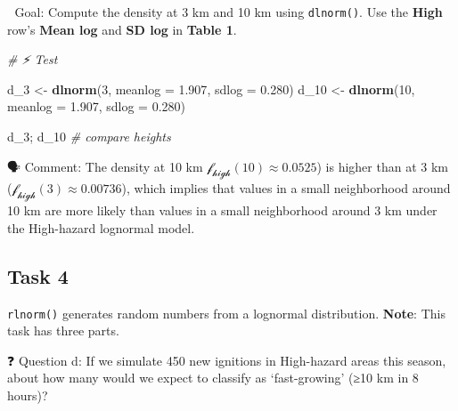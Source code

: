 \documentclass[
  12pt,
]{scrreprt}
\newenvironment{Shaded}{\begin{snugshade}}{\end{snugshade}}
\newcommand{\AttributeTok}[1]{\textcolor[rgb]{0.13,0.29,0.53}{#1}}
\newcommand{\CommentTok}[1]{\textcolor[rgb]{0.56,0.35,0.01}{\textit{#1}}}
\newcommand{\DecValTok}[1]{\textcolor[rgb]{0.00,0.00,0.81}{#1}}
\newcommand{\FloatTok}[1]{\textcolor[rgb]{0.00,0.00,0.81}{#1}}
\newcommand{\FunctionTok}[1]{\textcolor[rgb]{0.13,0.29,0.53}{\textbf{#1}}}
\newcommand{\NormalTok}[1]{#1}
\newcommand{\OtherTok}[1]{\textcolor[rgb]{0.56,0.35,0.01}{#1}}
\begin{document}
🎯 Goal: Compute the density at 3 km and 10 km using \texttt{dlnorm()}. Use the \textbf{High} row's \textbf{Mean log} and \textbf{SD log} in \textbf{Table 1}.

\begin{Shaded}
\begin{Highlighting}[]
\CommentTok{\# ⚡ Test}

\NormalTok{d\_3  }\OtherTok{\textless{}{-}} \FunctionTok{dlnorm}\NormalTok{(}\DecValTok{3}\NormalTok{,  }\AttributeTok{meanlog =} \FloatTok{1.907}\NormalTok{, }\AttributeTok{sdlog =} \FloatTok{0.280}\NormalTok{)}
\NormalTok{d\_10 }\OtherTok{\textless{}{-}} \FunctionTok{dlnorm}\NormalTok{(}\DecValTok{10}\NormalTok{, }\AttributeTok{meanlog =} \FloatTok{1.907}\NormalTok{, }\AttributeTok{sdlog =} \FloatTok{0.280}\NormalTok{)}
\end{Highlighting}
\end{Shaded}

\begin{Shaded}
\begin{Highlighting}[]
\NormalTok{d\_3; d\_10  }\CommentTok{\# compare heights}
\end{Highlighting}
\end{Shaded}

🗣 Comment: The density at 10 km \(\mathcal{f_{high}}(10) \approx 0.0525\)) is higher than at 3 km (\(\mathcal{f_{high}}(3) \approx 0.00736\)), which implies that values in a small neighborhood around 10 km are more likely than values in a small neighborhood around 3 km under the High-hazard lognormal model.

\subsection{Task 4}\label{task-4-1}

\texttt{rlnorm()} generates random numbers from a lognormal distribution. \textbf{Note}: This task has three parts.

❓ Question d: If we simulate 450 new ignitions in High-hazard areas this season, about how many would we expect to classify as `fast-growing' (≥10 km in 8 hours)?
\end{document}
